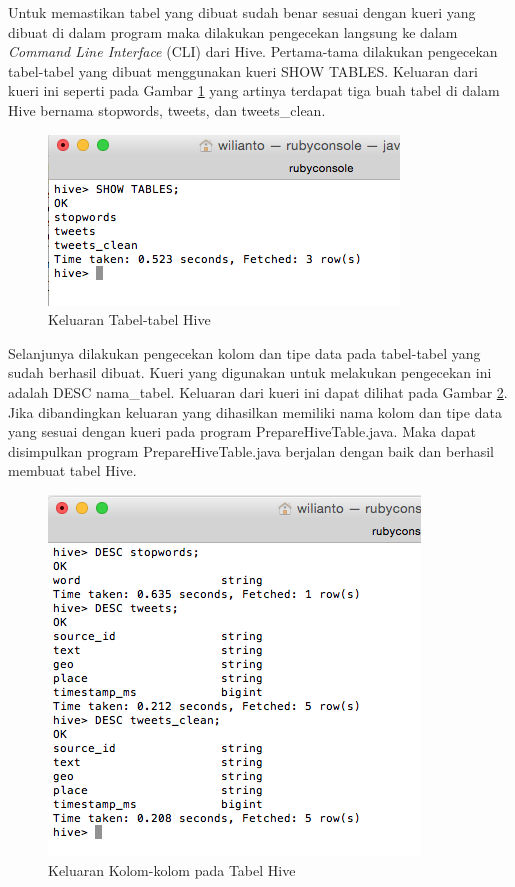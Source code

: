 Untuk memastikan tabel yang dibuat sudah benar sesuai dengan kueri yang dibuat di dalam program maka dilakukan pengecekan langsung ke dalam \textit{Command Line Interface} (CLI) dari Hive. Pertama-tama dilakukan pengecekan tabel-tabel yang dibuat menggunakan kueri SHOW TABLES. Keluaran dari kueri ini seperti pada Gambar \ref{fig:show-tables-hive} yang artinya terdapat tiga buah tabel di dalam Hive bernama stopwords, tweets, dan tweets\_clean.

\begin{figure}
	\centering
	\includegraphics[scale=1]{Gambar/show-tables-hive.png}
	\caption[Keluaran Tabel-tabel Hive]{Keluaran Tabel-tabel Hive}
	\label{fig:show-tables-hive}
\end{figure}

Selanjunya dilakukan pengecekan kolom dan tipe data pada tabel-tabel yang sudah berhasil dibuat. Kueri yang digunakan untuk melakukan pengecekan ini adalah DESC nama\_tabel. Keluaran dari kueri ini dapat dilihat pada Gambar \ref{fig:desc-tables-hive}. Jika dibandingkan keluaran yang dihasilkan memiliki nama kolom dan tipe data yang sesuai dengan kueri pada program PrepareHiveTable.java. Maka dapat disimpulkan program PrepareHiveTable.java berjalan dengan baik dan berhasil membuat tabel Hive.

\begin{figure}
	\centering
	\includegraphics[scale=1]{Gambar/desc-tables-hive.png}
	\caption[Keluaran Kolom-kolom pada Tabel Hive]{Keluaran Kolom-kolom pada Tabel Hive}
	\label{fig:desc-tables-hive}
\end{figure}

